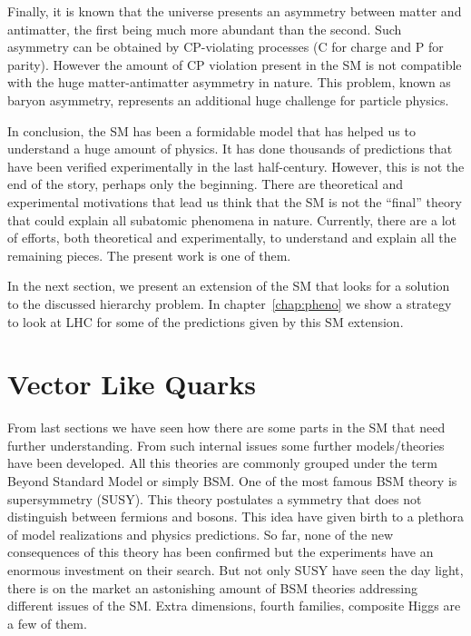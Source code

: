 Finally, it is known that the universe presents an asymmetry between matter and antimatter, the first being much more abundant than the second. Such asymmetry can be obtained by CP-violating processes (C for charge and P for parity). However the amount of CP violation present in the SM is not compatible with the huge matter-antimatter asymmetry in nature. This problem, known as baryon asymmetry, represents an additional huge challenge for particle physics. 

In conclusion, the SM has been a formidable model that has helped us to understand a huge amount of physics. It has done thousands of predictions that have been verified experimentally in the last half-century. However, this is not the end of the story, perhaps only the beginning. There are theoretical and experimental motivations that lead us think that the SM is not the ``final'' theory that could explain all subatomic phenomena in nature. Currently, there are a lot of efforts, both theoretical and experimentally, to understand and explain all the remaining pieces. The present work is one of them.

In the next section, we present an extension of the SM that looks for a solution to the discussed hierarchy problem. In chapter~\ref{chap:pheno} we show a strategy to look at LHC for some of the predictions given by this SM extension.  %

\section{Vector Like Quarks}

\label{chap:VLQ}

From last sections we have seen how there are some parts in the SM that need further understanding. From such internal issues some further models/theories have been developed. All this theories are commonly grouped under the term Beyond Standard Model or simply BSM. One of the most famous BSM theory is supersymmetry (SUSY). This theory postulates a symmetry that does not distinguish between fermions and bosons. This idea have given birth to a plethora of model realizations and physics predictions. So far, none of the new consequences of this theory has been confirmed but the experiments have an enormous investment on their search. But not only SUSY have seen the day light, there is on the market an astonishing amount of BSM theories addressing different issues of the SM. Extra dimensions, fourth families, composite Higgs are a few of them.

